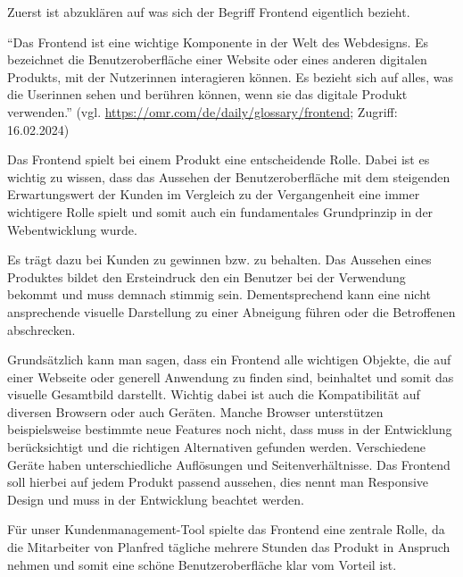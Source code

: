 Zuerst ist abzuklären auf was sich der Begriff Frontend eigentlich bezieht.

“Das Frontend ist eine wichtige Komponente in der Welt des Webdesigns. Es bezeichnet die Benutzeroberfläche einer Website oder eines anderen digitalen Produkts, mit der Nutzerinnen interagieren können. Es bezieht sich auf alles, was die Userinnen sehen und berühren können, wenn sie das digitale Produkt verwenden.”
\newline
(vgl. \url{https://omr.com/de/daily/glossary/frontend}; Zugriff: 16.02.2024)

Das Frontend spielt bei einem Produkt eine entscheidende Rolle. Dabei ist es wichtig zu wissen, dass das Aussehen der Benutzeroberfläche mit dem steigenden Erwartungswert der Kunden im Vergleich zu der Vergangenheit eine immer wichtigere Rolle spielt und somit auch ein fundamentales Grundprinzip in der Webentwicklung wurde. 

Es trägt dazu bei Kunden zu gewinnen bzw. zu behalten. Das Aussehen eines Produktes bildet den Ersteindruck den ein Benutzer bei der Verwendung bekommt und muss demnach stimmig sein. Dementsprechend kann eine nicht ansprechende visuelle Darstellung zu einer Abneigung führen oder die Betroffenen abschrecken. 

Grundsätzlich kann man sagen, dass ein Frontend alle wichtigen Objekte, die auf einer Webseite oder generell Anwendung zu finden sind, beinhaltet und somit das visuelle Gesamtbild darstellt. Wichtig dabei ist auch die Kompatibilität auf diversen Browsern oder auch Geräten. Manche Browser unterstützen beispielsweise bestimmte neue Features noch nicht, dass muss in der Entwicklung berücksichtigt und die richtigen Alternativen gefunden werden. Verschiedene Geräte haben unterschiedliche Auflösungen und Seitenverhältnisse. Das Frontend soll hierbei auf jedem Produkt passend aussehen, dies nennt man Responsive Design und muss in der Entwicklung beachtet werden.

Für unser Kundenmanagement-Tool spielte das Frontend eine zentrale Rolle, da die Mitarbeiter von Planfred tägliche mehrere Stunden das Produkt in Anspruch nehmen und somit eine schöne Benutzeroberfläche klar vom Vorteil ist.

\cite{frontend_grundlagen}
